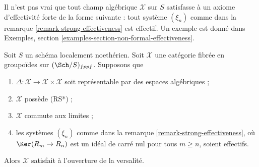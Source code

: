 \noindent
Il n'est pas vrai que tout champ algébrique $\mathcal{X}$ sur $S$ satisfasse
à un axiome d'effectivité forte de la forme suivante : tout système $(\xi_n)$
comme dans la remarque \ref{remark-strong-effectiveness} est effectif. Un
exemple est donné dans Exemples, section
\ref{examples-section-non-formal-effectiveness}.

\begin{lemma}
\label{lemma-SGE-implies-openness-versality}
Soit $S$ un schéma localement noethérien. Soit $\mathcal{X}$ une catégorie
fibrée en groupoïdes sur $(\Sch/S)_{fppf}$. Supposons que
\begin{enumerate}
\item $\Delta : \mathcal{X} \to \mathcal{X} \times \mathcal{X}$ soit
représentable par des espaces algébriques ;
\item $\mathcal{X}$ possède (RS*) ;
\item $\mathcal{X}$ commute aux limites ;
\item les systèmes $(\xi_n)$ comme dans la remarque
\ref{remark-strong-effectiveness}, où $\Ker(R_m \to R_n)$ est un idéal de
carré nul pour tous $m \geq n$, soient effectifs.
\end{enumerate}
Alors $\mathcal{X}$ satisfait à l'ouverture de la versalité.
\end{lemma}

